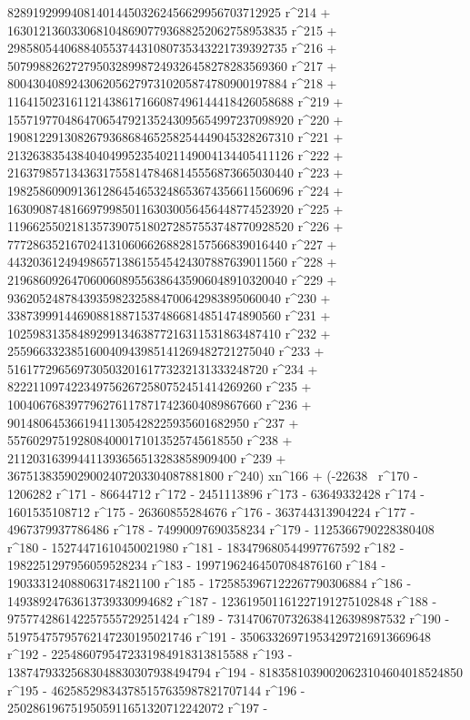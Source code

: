        8289192999408140144503262456629956703712925 r^214 + 
       16301213603306810486907793688252062758953835 r^215 + 
       29858054406884055374431080735343221739392735 r^216 + 
       50799882627279503289987249326458278283569360 r^217 + 
       80043040892430620562797310205874780900197884 r^218 + 
       116415023161121438617166087496144418426058688 r^219 + 
       155719770486470654792135243095654997237098920 r^220 + 
       190812291308267936868465258254449045328267310 r^221 + 
       213263835438404049952354021149004134405411126 r^222 + 
       216379857134363175581478468145556873665030440 r^223 + 
       198258609091361286454653248653674356611560696 r^224 + 
       163090874816697998501163030056456448774523920 r^225 + 
       119662550218135739075180272857553748770928520 r^226 + 
       77728635216702413106066268828157566839016440 r^227 + 
       44320361249498657138615545424307887639011560 r^228 + 
       21968609264706006089556386435906048910320040 r^229 + 
       9362052487843935982325884700642983895060040 r^230 + 
       3387399914469088188715374866814851474890560 r^231 + 
       1025983135848929913463877216311531863487410 r^232 + 
       255966332385160040943985141269482721275040 r^233 + 
       51617729656973050320161773232131333248720 r^234 + 
       8222110974223497562672580752451414269260 r^235 + 
       1004067683977962761178717423604089867660 r^236 + 
       90148064536619411305428225935601682950 r^237 + 
       5576029751928084000171013525745618550 r^238 + 
       211203163994411393656513283858909400 r^239 + 
       3675138359029002407203304087881800 r^240) xn^166 + (-22638 \
r^170 - 1206282 r^171 - 86644712 r^172 - 2451113896 r^173 - 
       63649332428 r^174 - 1601535108712 r^175 - 
       26360855284676 r^176 - 363744313904224 r^177 - 
       4967379937786486 r^178 - 74990097690358234 r^179 - 
       1125366790228380408 r^180 - 15274471610450021980 r^181 - 
       183479680544997767592 r^182 - 1982251297956059528234 r^183 - 
       19971962464507084876160 r^184 - 
       190333124088063174821100 r^185 - 
       1725853967122267790306884 r^186 - 
       14938924763613739330994682 r^187 - 
       123619501161227191275102848 r^188 - 
       975774286142257555729251424 r^189 - 
       7314706707326384126398987532 r^190 - 
       51975475795762147230195021746 r^191 - 
       350633269719534297216913669648 r^192 - 
       2254860795472331984918313815588 r^193 - 
       13874793325683048830307938494794 r^194 - 
       81835810390020623104604018524850 r^195 - 
       462585298343785157635987821707144 r^196 - 
       2502861967519505911651320712242072 r^197 - 
